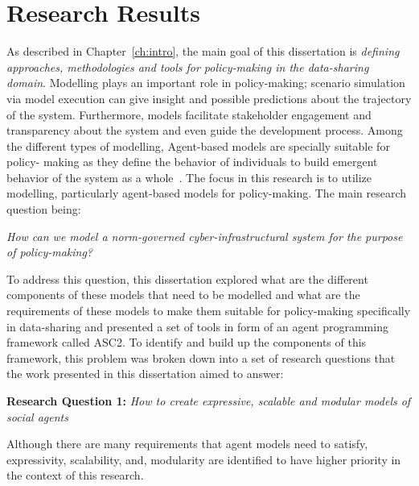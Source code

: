 \section{Research Results}

As described in Chapter~\ref{ch:intro}, the main goal of this dissertation is \textit{defining approaches, methodologies and tools for policy-making in the data-sharing domain}. Modelling plays an important role in policy-making; scenario simulation via model execution can give insight and possible predictions about the trajectory of the system. Furthermore, models facilitate stakeholder engagement and transparency about the system and even guide the development process. Among the different types of modelling, Agent-based models are specially suitable for policy-
making as they define the behavior of individuals to build emergent behavior of the system as a whole~\cite{dignum2008towardsagents}. The focus in this research is to utilize modelling, particularly agent-based models for policy-making. The main research question being: 
\begin{displayquote}
    \textit{How can we model a norm-governed cyber-infrastructural system for the purpose of policy-making?}
\end{displayquote}

To address this question, this dissertation explored what are the different components of these models that need to be modelled and what are the requirements of these models to make them suitable for policy-making specifically in data-sharing and presented a set of tools in form of an agent programming framework called ASC2. To identify and build up the components of this framework, this problem was broken down into a set of research questions that the work presented in this dissertation aimed to answer:

\begin{displayquote}
\textbf{Research Question 1:} \textit{How to create expressive, scalable and modular models of social agents}
\end{displayquote}

Although there are many requirements that agent models need to satisfy, expressivity, scalability, and, modularity are identified to have higher priority in the context of this research. 

